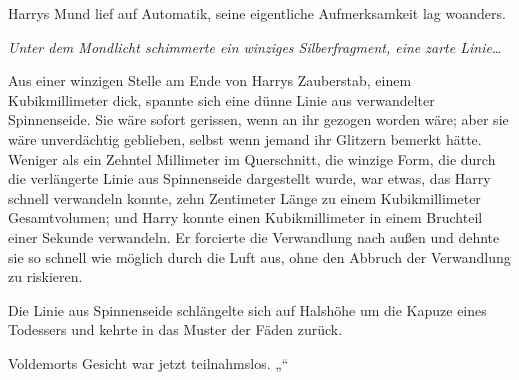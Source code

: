 Harrys Mund lief auf Automatik, seine eigentliche Aufmerksamkeit lag woanders.

\emph{Unter dem Mondlicht schimmerte ein winziges Silberfragment, eine zarte Linie…}

Aus einer winzigen Stelle am Ende von Harrys Zauberstab, einem Kubikmillimeter dick, spannte sich eine dünne Linie aus verwandelter Spinnenseide. Sie wäre sofort gerissen, wenn an ihr gezogen worden wäre; aber sie wäre unverdächtig geblieben, selbst wenn jemand ihr Glitzern bemerkt hätte. Weniger als ein Zehntel Millimeter im Querschnitt, die winzige Form, die durch die verlängerte Linie aus Spinnenseide dargestellt wurde, war etwas, das Harry schnell verwandeln konnte, zehn Zentimeter Länge zu einem Kubikmillimeter Gesamtvolumen; und Harry konnte einen Kubikmillimeter in einem Bruchteil einer Sekunde verwandeln. Er forcierte die Verwandlung nach außen und dehnte sie so schnell wie möglich durch die Luft aus, ohne den Abbruch der Verwandlung zu riskieren.

Die Linie aus Spinnenseide schlängelte sich auf Halshöhe um die Kapuze eines Todessers und kehrte in das Muster der Fäden zurück.

Voldemorts Gesicht war jetzt teilnahmslos.
„“

